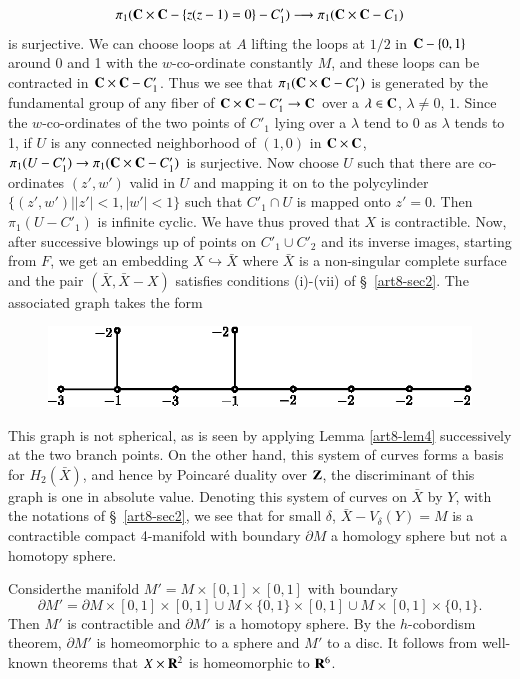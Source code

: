 $$
\pi_1 (\mathbf{C} \times \mathbf{C} - \{z(z-1) =0 \} - C'_1) \longrightarrow \pi_1 (\mathbf{C} \times \mathbf{C} - C_1)
$$
is surjective. We can choose loops at $A$ lifting the loops at $1/2$ in $\mathbf{C} - \{0,1\}$ around 0 and 1 with the $w$-co-ordinate constantly $M$, and these loops can be contracted in $\mathbf{C} \times \mathbf{C} - C'_1$. Thus we see that $\pi_1 (\mathbf{C} \times \mathbf{C} - C'_1)$ is generated by the fundamental group of any fiber of $\mathbf{C} \times \mathbf{C} - C'_1 \to \mathbf{C}$ over a $\lambda \in \mathbf{C}$, $\lambda \neq 0$, $1$. Since the $w$-co-ordinates of the two points of $C'_1$ lying over a $\lambda$ tend to 0 as $\lambda$ tends to 1, if $U$ is any connected neighborhood of $(1,0)$ in $\mathbf{C} \times \mathbf{C}$, $\pi_1 (U-C'_1) \to \pi_1 (\mathbf{C} \times \mathbf{C} - C'_1)$ is surjective. Now choose $U$ such that there are co-ordinates $(z',w')$ valid in $U$ and mapping it on to the polycylinder $\{ (z', w')||z'| < 1, |w'|<1\} $ such that $C'_1 \cap U$ is mapped onto $z'=0$. Then $\pi_1 (U - C'_1)$ is infinite cyclic. We have thus proved that $X$ is contractible. Now, after successive blowings up of points on $C'_1 \cup C'_2$ and its inverse images, starting from $F$, we get an embedding $X \hookrightarrow \bar{X}$ where $\bar{X}$ is a non-singular complete surface and the pair $(\bar{X},\bar{X} -X)$ satisfies conditions (i)-(vii) of \S ~\ref{art8-sec2}. The associated graph takes the form
\begin{figure}[H]
\centering
\includegraphics{fig25.eps}
\end{figure}
\noindent
This graph is not spherical, as is seen by applying Lemma \ref{art8-lem4} successively at the two branch points. On the other hand, this system of curves forms a basis for $H_2 (\bar{X})$, and hence by Poincar\'e duality over $\mathbf{Z}$, the discriminant of this graph is one in absolute value. Denoting this system of curves on $\bar{X}$ by $Y$, with the notations of \S ~\ref{art8-sec2}, we see that for small $\delta$, $\bar{X} - V_\delta (Y) = M$ is a contractible compact 4-manifold with boundary $\partial M$ a homology sphere but not a homotopy sphere.

Consider\pageoriginale the manifold $M' = M \times [0,1] \times [0,1]$ with boundary
$$
\partial M' = \partial M \times [0,1] \times [0,1] \cup M \times \{0,1\} \times [0,1] \cup M \times [0,1] \times \{0,1\}.
$$
Then $M'$ is contractible and $\partial M'$ is a homotopy sphere. By the $h$-cobordism theorem, $\partial M'$ is homeomorphic to a sphere and $M'$ to a disc. It follows from well-known theorems that $X \times \mathbf{R}^2$ is homeomorphic to $\mathbf{R}^6$.

